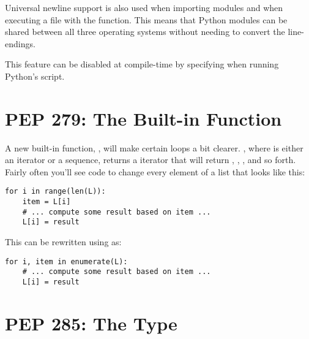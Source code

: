 \documentclass{howto}
\begin{document}
Universal newline support is also used when importing modules and when
executing a file with the  function.  This means
that Python modules can be shared between all three operating systems
without needing to convert the line-endings.

This feature can be disabled at compile-time by specifying 
 when running Python's
 script.

\begin{seealso}


\end{seealso}


\section{PEP 279: The  Built-in Function}

A new built-in function, , will make
certain loops a bit clearer.  , where
 is either an iterator or a sequence, returns a iterator
that will return , , , and so forth.  Fairly
often you'll see code to change every element of a list that looks
like this:

\begin{verbatim}
for i in range(len(L)):
    item = L[i]
    # ... compute some result based on item ...
    L[i] = result
\end{verbatim}

This can be rewritten using  as:

\begin{verbatim}
for i, item in enumerate(L):
    # ... compute some result based on item ...
    L[i] = result
\end{verbatim}


\begin{seealso}


\end{seealso}


\section{PEP 285: The  Type\label{section-bool}}
\end{document}
